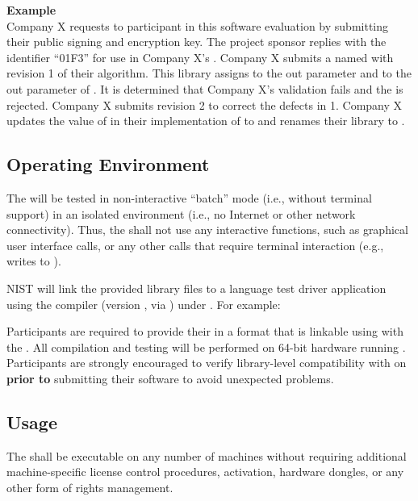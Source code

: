 \textbf{Example}\\
Company X requests to participant in this software evaluation by submitting
their public signing and encryption key. The project sponsor replies with the
identifier ``01F3'' for use in Company X's \implementation. Company X submits a
\lib named  with revision 1 of their algorithm. This
library assigns  to the  out parameter and
 to the  out parameter of  . It is
determined that Company X's validation fails and the \lib is rejected. Company
X submits revision 2 to correct the defects in 1. Company X updates the value
of  in their implementation of  to  and
renames their library to .

\subsection{Operating Environment}
\label{subsec:software-environment}

The \lib will be tested in non-interactive ``batch'' mode (i.e., without
terminal support) in an isolated environment (i.e., no Internet or other network
connectivity). Thus, the \lib shall not use any interactive functions, such as
graphical user interface calls, or any other calls that require terminal
interaction (e.g., writes to ).

NIST will link the provided library files to a \cpp language test driver
application using the compiler  (version , via
) under \textbf{\os}. For example:
\begin{center}
\end{center}

Participants are required to provide their \libs in a format that is linkable
using  with the \testdriver. All compilation and testing will be
performed on 64-bit hardware running \os. Participants are strongly encouraged
to verify library-level compatibility with  on \os \textbf{prior to}
submitting their software to avoid unexpected problems.

\subsection{Usage}
\label{subsec:software-usage}

The \lib shall be executable on any number of machines without requiring
additional machine-specific license control procedures, activation, hardware
dongles, or any other form of rights management.

